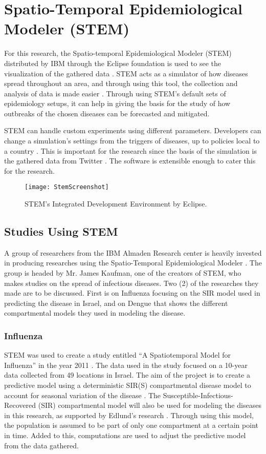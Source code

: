 \section{Spatio-Temporal Epidemiological Modeler (STEM)}

For this research, the Spatio-temporal Epidemiological Modeler (STEM) distributed by IBM through the Eclipse foundation is used to see the visualization of the gathered data \cite{StemIBM}. STEM acts as a simulator of how diseases spread throughout an area, and through using this tool, the collection and analysis of data is made easier \cite{StemIBM}. Through using STEM's default sets of epidemiology setups, it can help in giving the basis for the study of how outbreaks of the chosen diseases can be forecasted and mitigated.

STEM can handle custom experiments using different parameters. Developers can change a simulation's settings from the triggers of diseases, up to policies local to a country \cite{StemIBM}. This is important for the research since the basis of the simulation is the gathered data from Twitter \cite{StemIBM}. The software is extensible enough to cater this for the research.

\begin{figure}[!ht]
    \centering
    \texttt{[image: StemScreenshot]}
	\caption{STEM's Integrated Development Environment by Eclipse.}
	\label{fig:StemScreenshot}
\end{figure}

\subsection{Studies Using STEM}
A group of researchers from the IBM Almaden Research center is heavily invested in producing researches using the Spatio-Temporal Epidemiological Modeler \cite{ibmalmaden}. The group is headed by Mr. James Kaufman, one of the creators of STEM, who makes studies on the spread of infectious diseases. Two (2) of the researches they made are to be discussed. First is on Influenza focusing on the SIR model used in predicting the disease in Israel, and on Dengue that shows the different compartmental models they used in modeling the disease.

\subsubsection{Influenza}
STEM was used to create a study entitled ``A Spatiotemporal Model for Influenza'' in the year 2011 \cite{edlund2009spatiotemporal}. The data used in the study focused on a 10-year data collected from 49 locations in Israel. The aim of the project is to create a predictive model using a deterministic SIR(S) compartmental disease model to account for seasonal variation of the disease \cite{edlund2009spatiotemporal}. The Susceptible-Infectious-Recovered (SIR) compartmental model will also be used for modeling the diseases in this research, as supported by Edlund's research \cite{edlund2009spatiotemporal}. Through using this model, the population is assumed to be part of only one compartment at a certain point in time. Added to this, computations are used to adjust the predictive model from the data gathered. 

